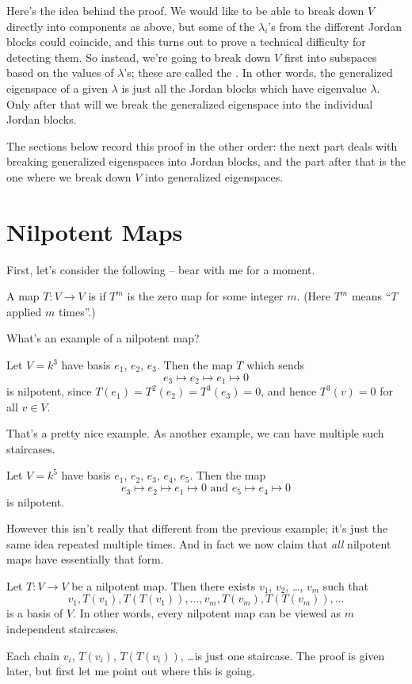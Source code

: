 Here's the idea behind the proof.
We would like to be able to break down $V$ directly into components as above,
but some of the $\lambda_i$'s from the different Jordan blocks could coincide,
and this turns out to prove a technical difficulty for detecting them.
So instead, we're going to break down $V$ first into subspaces based on the values of $\lambda$'s;
these are called the .
In other words, the generalized eigenspace of a given $\lambda$
is just all the Jordan blocks which have eigenvalue $\lambda$.
Only after that will we break the generalized eigenspace into the individual Jordan blocks.

The sections below record this proof in the other order:
the next part deals with breaking generalized eigenspaces into Jordan blocks,
and the part after that is the one where we break down $V$ into
generalized eigenspaces.

\section{Nilpotent Maps}
First, let's consider the following -- bear with me for a moment.
\begin{definition}
	A map $T: V \to V$ is  if $T^m$ is the zero map for some integer $m$.
	(Here $T^m$ means ``$T$ applied $m$ times''.)
\end{definition}
What's an example of a nilpotent map?
\begin{example}
	Let $V = k^3$ have basis $e_1$, $e_2$, $e_3$.
	Then the map $T$ which sends
	\[ e_3 \mapsto e_2 \mapsto e_1 \mapsto 0 \]
	is nilpotent, since $T(e_1) = T^2(e_2) = T^3(e_3) = 0$,
	and hence $T^3(v) = 0$ for all $v \in V$.
\end{example}
That's a pretty nice example. As another example, we can have multiple such staircases.
\begin{example}
	Let $V = k^5$ have basis $e_1$, $e_2$, $e_3$, $e_4$, $e_5$.
	Then the map 
	\[ e_3 \mapsto e_2 \mapsto e_1 \mapsto 0 \text{ and } e_5 \mapsto e_4 \mapsto 0 \]
	is nilpotent.
\end{example}
However this isn't really that different from the previous example;
it's just the same idea repeated multiple times.
And in fact we now claim that \emph{all} nilpotent maps have essentially that form.

\begin{theorem}
	Let $T : V \to V$ be a nilpotent map.
	Then there exists $v_1$, $v_2$, \dots, $v_m$ such that
	\[ v_1, T(v_1), T(T(v_1)), \dots, v_m, T(v_m), T(T(v_m)), \dots \]
	is a basis of $V$.
	In other words, every nilpotent map can be viewed as $m$ independent staircases.
\end{theorem}
Each chain $v_i$, $T(v_i)$, $T(T(v_i))$, \dots is just one staircase.
The proof is given later, but first let me point out where this is going.

